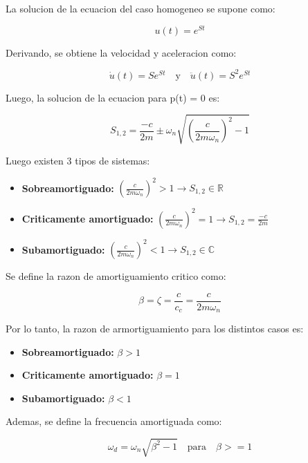 \documentclass{article}  %
\begin{document}
La solucion de la ecuacion del caso homogeneo se supone como:

\begin{equation}
    u(t) = e^{St}
\end{equation}

Derivando, se obtiene la velocidad y aceleracion como:

\begin{equation}
    \dot{u}(t) = Se^{St} \quad \text{y} \quad \ddot{u}(t) = S^2 e^{St}
\end{equation}

Luego, la solucion de la ecuacion para p(t) = 0 es:

\begin{equation}
    S_{1,2} =  \frac{-c}{2m} \pm \omega_n \sqrt{(\frac{c}{2m\omega_n})^2 - 1}
\end{equation}

Luego existen 3 tipos de sistemas:
\begin{itemize}
    \item \textbf{Sobreamortiguado:} $(\frac{c}{2m\omega_n})^2 > 1 \rightarrow S_{1,2} \in \mathbb{R}$ 
    \item \textbf{Criticamente amortiguado:} $(\frac{c}{2m\omega_n})^2 = 1  \rightarrow S_{1,2} = \frac{-c}{2m}$
    \item \textbf{Subamortiguado:} $(\frac{c}{2m\omega_n})^2 < 1 \rightarrow S_{1,2} \in \mathbb{C}$
\end{itemize}

Se define la razon de amortiguamiento critico como:

\begin{equation}
    \beta = \zeta = \frac{c}{c_c} = \frac{c}{2m\omega_n}
\end{equation}

Por lo tanto, la razon de armortiguamiento para los distintos casos es:

\begin{itemize}
    \item \textbf{Sobreamortiguado:} $\beta > 1$
    \item \textbf{Criticamente amortiguado:} $\beta = 1$
    \item \textbf{Subamortiguado:} $\beta < 1$
\end{itemize}

Ademas, se define la frecuencia amortiguada como:

\begin{equation}
    \omega_d = \omega_n \sqrt{\beta^2 - 1} \quad \text{para} \quad \beta >= 1
\end{equation}
\end{document}
